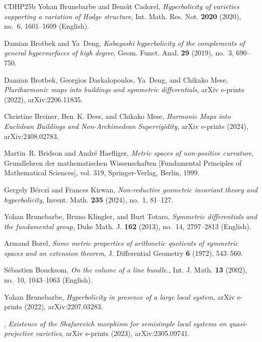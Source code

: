 \documentclass[english]{amsproc}
\theoremstyle{plain}
\theoremstyle{definition}
\theoremstyle{remark}
\theoremstyle{plain}
\numberwithin{equation}{thm} %
\begin{document}
\begin{thebibliography}{CDHP25b}
		Yohan Brunebarbe and Beno{\^{\i}}t Cadorel, \emph{Hyperbolicity of varieties
			supporting a variation of {Hodge} structure}, Int. Math. Res. Not.
		\textbf{2020} (2020), no.~6, 1601--1609 (English).
		
		Damian Brotbek and Ya~Deng, \emph{Kobayashi hyperbolicity of the complements of
			general hypersurfaces of high degree}, Geom. Funct. Anal. \textbf{29} (2019),
		no.~3, 690--750. 
		
		Damian {Brotbek}, Georgios {Daskalopoulos}, Ya~{Deng}, and Chikako {Mese},
		\emph{{Pluriharmonic maps into buildings and symmetric differentials}}, arXiv
		e-prints (2022), arXiv:2206.11835.
		
		Christine {Breiner}, Ben~K. {Dees}, and Chikako {Mese}, \emph{{Harmonic Maps
				into Euclidean Buildings and Non-Archimedean Superrigidity}}, arXiv e-prints
		(2024), arXiv:2408.02783.
		
		Martin~R. Bridson and Andr\'e Haefliger, \emph{Metric spaces of non-positive
			curvature}, Grundlehren der mathematischen Wissenschaften [Fundamental
		Principles of Mathematical Sciences], vol. 319, Springer-Verlag, Berlin,
		1999. 
		
		Gergely B\'erczi and Frances Kirwan, \emph{Non-reductive geometric invariant
			theory and hyperbolicity}, Invent. Math. \textbf{235} (2024), no.~1, 81--127.
		
		Yohan Brunebarbe, Bruno Klingler, and Burt Totaro, \emph{Symmetric
			differentials and the fundamental group}, Duke Math. J. \textbf{162} (2013),
		no.~14, 2797--2813 (English).
		
		Armand Borel, \emph{Some metric properties of arithmetic quotients of symmetric
			spaces and an extension theorem}, J. Differential Geometry \textbf{6} (1972),
		543--560. 
		
		S{\'e}bastien Boucksom, \emph{On the volume of a line bundle.}, Int. J. Math.
		\textbf{13} (2002), no.~10, 1043--1063 (English).
		
		Yohan {Brunebarbe}, \emph{{Hyperbolicity in presence of a large local system}},
		arXiv e-prints (2022), arXiv:2207.03283.
		
		\bysame, \emph{{Existence of the Shafarevich morphism for semisimple local
				systems on quasi-projective varieties}}, arXiv e-prints (2023),
		arXiv:2305.09741.
		

\end{thebibliography}
\end{document}
